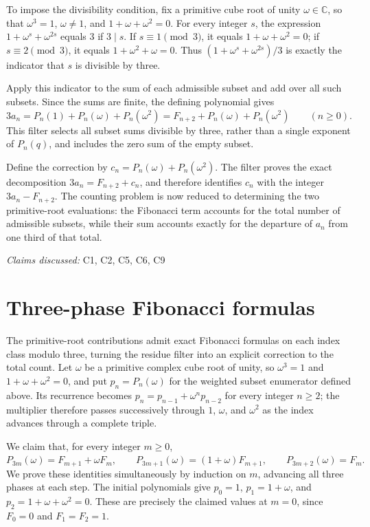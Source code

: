 \documentclass[11pt]{article}
\begin{document}
To impose the divisibility condition, fix a primitive cube root of unity $\omega\in\mathbb C$, so that $\omega^3=1$, $\omega\neq 1$, and $1+\omega+\omega^2=0$. For every integer $s$, the expression $1+\omega^s+\omega^{2s}$ equals $3$ if $3\mid s$. If $s\equiv 1\pmod 3$, it equals $1+\omega+\omega^2=0$; if $s\equiv 2\pmod 3$, it equals $1+\omega^2+\omega=0$. Thus $(1+\omega^s+\omega^{2s})/3$ is exactly the indicator that $s$ is divisible by three.

Apply this indicator to the sum of each admissible subset and add over all such subsets. Since the sums are finite, the defining polynomial gives
$3a_n=P_n(1)+P_n(\omega)+P_n(\omega^2)=F_{n+2}+P_n(\omega)+P_n(\omega^2)\qquad(n\geq 0).$
This filter selects all subset sums divisible by three, rather than a single exponent of $P_n(q)$, and includes the zero sum of the empty subset.

Define the correction by $c_n=P_n(\omega)+P_n(\omega^2)$. The filter proves the exact decomposition $3a_n=F_{n+2}+c_n$, and therefore identifies $c_n$ with the integer $3a_n-F_{n+2}$. The counting problem is now reduced to determining the two primitive-root evaluations: the Fibonacci term accounts for the total number of admissible subsets, while their sum accounts exactly for the departure of $a_n$ from one third of that total.

\textit{Claims discussed: }C1, C2, C5, C6, C9
\section{Three-phase Fibonacci formulas}
The primitive-root contributions admit exact Fibonacci formulas on each index class modulo three, turning the residue filter into an explicit correction to the total count. Let $\omega$ be a primitive complex cube root of unity, so $\omega^3=1$ and $1+\omega+\omega^2=0$, and put $p_n=P_n(\omega)$ for the weighted subset enumerator defined above. Its recurrence becomes $p_n=p_{n-1}+\omega^n p_{n-2}$ for every integer $n\geq 2$; the multiplier therefore passes successively through $1$, $\omega$, and $\omega^2$ as the index advances through a complete triple.

We claim that, for every integer $m\geq 0$,
$P_{3m}(\omega)=F_{m+1}+\omega F_m,\qquad P_{3m+1}(\omega)=(1+\omega)F_{m+1},\qquad P_{3m+2}(\omega)=F_m.$
We prove these identities simultaneously by induction on $m$, advancing all three phases at each step. The initial polynomials give $p_0=1$, $p_1=1+\omega$, and $p_2=1+\omega+\omega^2=0$. These are precisely the claimed values at $m=0$, since $F_0=0$ and $F_1=F_2=1$.
\end{document}
